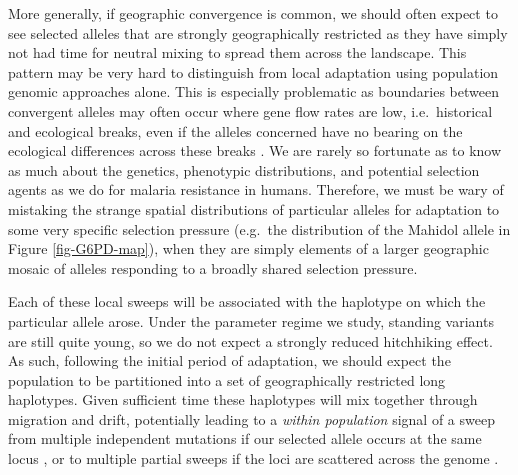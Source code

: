 \documentclass{article}
\newcommand{\mfp}[1]{{\it\color{red} #1} }
\begin{document}
More generally, if geographic convergence is common, we should often expect to see
selected alleles that are strongly geographically restricted as they
have simply not had time for neutral mixing to spread them across the landscape.
This pattern may be very hard to distinguish from local adaptation using population genomic approaches
alone. This is especially problematic as boundaries between convergent alleles may often
occur where gene flow rates are low, i.e.\ historical and ecological breaks, even if
the alleles concerned have no bearing on the ecological differences
across these breaks \citep[see][for a wide-ranging discussion of how allelic differentiation may build along particular zones]{bierne2011coupling}. 
We are rarely so fortunate as to know as much about the genetics, phenotypic distributions, 
and potential selection agents as we do for malaria resistance in humans. 
Therefore, we must be wary of mistaking the strange spatial distributions of particular alleles 
for adaptation to some very specific selection pressure (e.g.\ the distribution of the Mahidol allele in Figure \ref{fig-G6PD-map}), 
when they are simply elements of a larger geographic mosaic of alleles responding to a broadly shared selection pressure. 


Each of these local sweeps will be associated with the haplotype on which the particular allele arose. 
Under the parameter regime we study,
standing variants are still quite young, 
so we do not expect a strongly reduced hitchhiking effect. 
As such, following the initial period of
adaptation, we should expect the population to be partitioned into a
set of geographically restricted long haplotypes. 
Given sufficient time these haplotypes will mix together through
migration and drift, 
potentially leading to a \mfp{within population} signal of a sweep from multiple independent
mutations if our selected allele occurs at the same locus \citep{softsweepsIII}, 
or to multiple partial sweeps if the loci are scattered across the
genome \citep{CoopRalph:12}.
\end{document}
